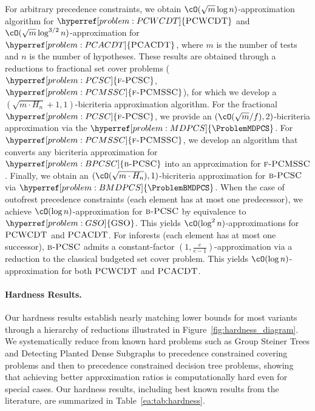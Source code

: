 

For arbitrary precedence constraints, we obtain $\cO(\sqrt{m}\log n)$-approximation algorithm for $\hyperref[problem:PCWCDT]{\ProblemPCWCDT}$ and $\cO(\sqrt{m}\log^{3/2}n)$-approximation for $\hyperref[problem:PCACDT]{\ProblemPCACDT}$, where $m$ is the number of tests and $n$ is the number of hypotheses. These results are obtained through a reductions to fractional set cover problems ($\hyperref[problem:PCSC]{\ProblemPCSC}$, $\hyperref[problem:PCMSSC]{\ProblemPCMSSC}$), for which we develop a $(\sqrt{m \cdot H_n}+1, 1)$-bicriteria approximation algorithm. For the fractional $\hyperref[problem:PCSC]{\ProblemPCSC}$, we provide an $(\cO(\sqrt{m}/f), 2)$-bicriteria approximation via the $\hyperref[problem:MDPCS]{\ProblemMDPCS}$. For $\hyperref[problem:PCMSSC]{\ProblemPCMSSC}$, we develop an algorithm that converts any bicriteria approximation for $\hyperref[problem:BPCSC]{\ProblemBPCSC}$ into an approximation for $\textup{\textsc{f-PCMSSC}}$. Finally, we obtain an $(\cO(\sqrt{m\cdot H_n}), 1)$-bicriteria approximation for $\textup{\textsc{b-PCSC}}$ via $\hyperref[problem:BMDPCS]{\ProblemBMDPCS}$. When the case of outofrest precedence constraints (each element has at most one predecessor), we achieve $\cO(\log n)$-approximation for $\textup{\textsc{b-PCSC}}$ by equivalence to $\hyperref[problem:GSO]{\ProblemGSO}$. This yields $\cO(\log^2 n)$-approximations for $\textup{\textsc{PCWCDT}}$ and $\textup{\textsc{PCACDT}}$. For inforests (each element has at most one successor), $\textup{\textsc{b-PCSC}}$ admits a constant-factor $(1, \frac{e}{e-1})$-approximation via a reduction to the classical budgeted set cover problem. This yields $\cO(\log n)$-approximation for both $\textup{\textsc{PCWCDT}}$ and $\textup{\textsc{PCACDT}}$.

\paragraph{Hardness Results.} Our hardness results establish nearly matching lower bounds for most variants through a hierarchy of reductions illustrated in Figure~\ref{fig:hardness_diagram}. We systematically reduce from known hard problems such as Group Steiner Trees and Detecting Planted Dense Subgraphs to precedence constrained covering problems and then to precedence constrained decision tree problems, showing that achieving better approximation ratios is computationally hard even for special cases. Our hardness results, including best known results from the literature, are summarized in Table~\ref{ea:tab:hardness}.

